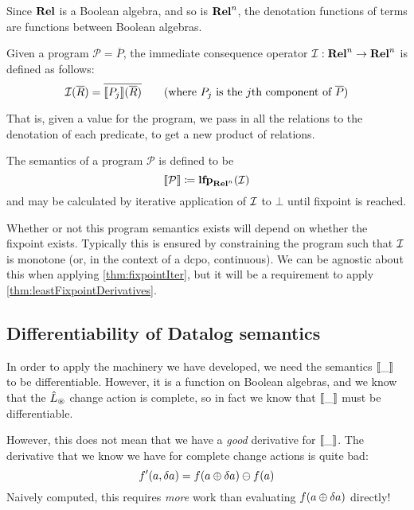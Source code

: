 Since $\mathbf{Rel}$ is a Boolean algebra, and so is $\mathbf{Rel}^n$, the denotation
functions of terms are functions between Boolean algebras.

\begin{defn}
  Given a program $\mathcal{P} = \overline{P}$, the immediate consequence operator $\mathcal{I}: \mathbf{Rel}^n \rightarrow \mathbf{Rel}^n$ is defined as follows:
  \begin{displaymath}
    \consq(\overline{R}) = \overline{\denote{P_j}(\overline{R})} \tag{where $P_j$ is the $j$th component of $\overline{P}$}
  \end{displaymath}
\end{defn}

That is, given a value for the program, we pass in all the relations
to the denotation of each predicate, to get a new product of relations.

\begin{defn}
  The semantics of a program $\mathcal{P}$ is defined to be
  \begin{displaymath}
    \llbracket \mathcal{P} \rrbracket \coloneqq \textbf{lfp}_{\mathbf{Rel}^n}(\mathcal{I})
  \end{displaymath}
  and may be calculated by iterative application of $\mathcal{I}$ to $\bot$ until
  fixpoint is reached.
\end{defn}

Whether or not this program semantics exists will depend on whether the fixpoint
exists. Typically this is ensured by constraining the program such that $\mathcal{I}$
is monotone (or, in the context of a dcpo, continuous). We can be agnostic
about this when applying \cref{thm:fixpointIter}, but it will be a requirement to
apply \cref{thm:leastFixpointDerivatives}.

\subsection{Differentiability of Datalog semantics}
\label{sec:datalogDifferentiability}

In order to apply the machinery we have developed, we need the semantics $\llbracket \_ \rrbracket$ to
be differentiable. However, it is a function on Boolean algebras, and we know
that the $\hat{L}_\circledast$ change action is complete, so in fact we know that
$\llbracket \_ \rrbracket$ must be differentiable.

However, this does not mean that we have a \emph{good} derivative for
$\llbracket \_ \rrbracket$. The derivative that we know we have for complete change actions
is quite bad:
\begin{displaymath}
  f'(a, \delta a) = f(a \oplus \delta a) \ominus f(a)
\end{displaymath}
Naively computed, this requires \emph{more} work than evaluating $f(a \oplus \delta a)$ directly!

